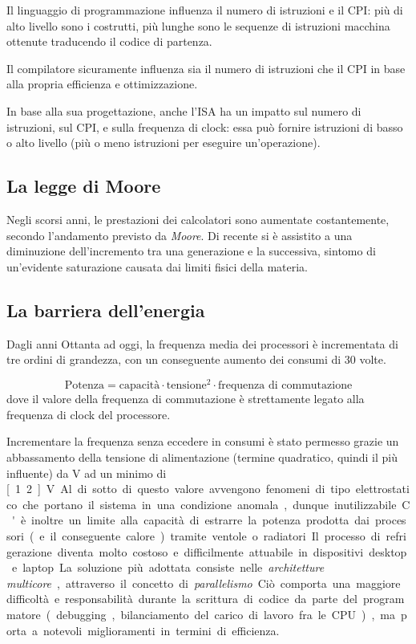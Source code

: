 Il linguaggio di programmazione influenza il numero di istruzioni e il CPI: più di alto livello sono i costrutti, più lunghe sono le sequenze di istruzioni macchina ottenute traducendo il codice di partenza.

Il compilatore sicuramente influenza sia il numero di istruzioni che il CPI in base alla propria efficienza e ottimizzazione.

In base alla sua progettazione, anche l'ISA ha un impatto sul numero di istruzioni, sul CPI, e sulla frequenza di clock: essa può fornire istruzioni di basso o alto livello (più o meno istruzioni per eseguire un'operazione).

\subsection{La legge di Moore}
Negli scorsi anni, le prestazioni dei calcolatori sono aumentate costantemente, secondo l'andamento previsto da \emph{Moore}. Di recente si è assistito a una diminuzione dell’incremento tra una generazione e la successiva, sintomo di un'evidente saturazione causata dai limiti fisici della materia.

\subsection{La barriera dell'energia}
Dagli anni Ottanta ad oggi, la frequenza media dei processori è incrementata di tre ordini di grandezza, con un conseguente aumento dei consumi di 30 volte.

\begin{equation*}
\text{Potenza} = \text{capacità} \cdot \text{tensione}^2 \cdot \text{frequenza di commutazione}
\end{equation*}
dove il valore della frequenza di commutazione è strettamente legato alla frequenza di clock del processore.

Incrementare la frequenza senza eccedere in consumi è stato permesso grazie un abbassamento della tensione di alimentazione (termine quadratico, quindi il più influente) da \unit[5]{V} ad un minimo di \unit[1.2]{V}.
Al di sotto di questo valore avvengono fenomeni di tipo elettrostatico che portano il sistema in una condizione anomala, dunque inutilizzabile.

C'è inoltre un limite alla capacità di estrarre la potenza prodotta dai processori (e il conseguente calore) tramite ventole o radiatori.
Il processo di refrigerazione diventa molto costoso e difficilmente attuabile in dispositivi desktop e laptop.

La soluzione più adottata consiste nelle \emph{architetture multicore}, attraverso il concetto di \emph{parallelismo}.
Ciò comporta una maggiore difficoltà e responsabilità durante la scrittura di codice da parte del programmatore (debugging, bilanciamento del carico di lavoro fra le CPU), ma porta a notevoli miglioramenti in termini di efficienza.

